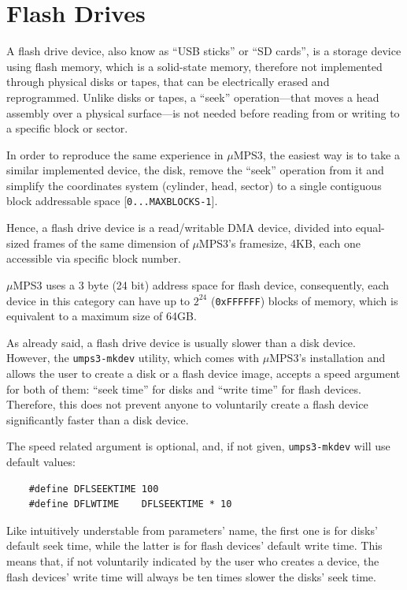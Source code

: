 \documentclass[12pt,a4paper,openright,twoside]{report}
\begin{document}
\section{Flash Drives}
	A flash drive device, also know as ``USB sticks'' or ``SD cards'', is a storage device using flash memory, which is a solid-state memory, therefore not implemented through physical disks or tapes, that can be electrically erased and reprogrammed.
	Unlike disks or tapes, a ``seek'' operation---that moves a head assembly over a physical surface---is not needed before reading from or writing to a specific block or sector.

	In order to reproduce the same experience in $\mu$MPS3, the easiest way is to take a similar implemented device, the disk, remove the ``seek'' operation from it and simplify the coordinates system (cylinder, head, sector) to a single contiguous block addressable space [\texttt{0...MAXBLOCKS-1}].

	Hence, a flash drive device is a read/writable DMA device, divided into equal-sized frames of the same dimension of $\mu$MPS3's framesize, 4KB, each one accessible via specific block number.

	$\mu$MPS3 uses a 3 byte (24 bit) address space for flash device, consequently, each device in this category can have up to $2^{24}$ (\texttt{0xFFFFFF}) blocks of memory, which is equivalent to a maximum size of 64GB. 

	As already said, a flash drive device is usually slower than a disk device.
	However, the \texttt{umps3-mkdev} utility, which comes with $\mu$MPS3's installation and allows the user to create a disk or a flash device image, accepts a speed argument for both of them: ``seek time'' for disks and ``write time'' for flash devices. Therefore, this does not prevent anyone to voluntarily create a flash device significantly faster than a disk device.

	The speed related argument is optional, and, if not given, \texttt{umps3-mkdev} will use default values:
	\begin{verbatim}
	#define DFLSEEKTIME 100
	#define DFLWTIME    DFLSEEKTIME * 10
	\end{verbatim}
	Like intuitively understable from parameters' name, the first one is for disks' default seek time, while the latter is for flash devices' default write time. This means that, if not voluntarily indicated by the user who creates a device, the flash devices' write time will always be ten times slower the disks' seek time.
	
\end{document}
